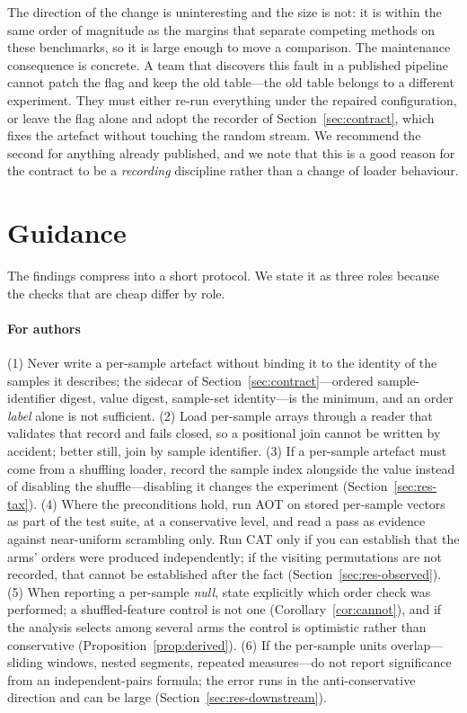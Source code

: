 \documentclass[a4paper,fleqn]{cas-sc}
\begin{document}
The direction of the change is uninteresting and the size is not: it is within
the same order of magnitude as the margins that separate competing methods on
these benchmarks, so it is large enough to move a comparison. The
maintenance consequence is concrete. A team that discovers this fault in a
published pipeline cannot patch the flag and keep the old table---the old table
belongs to a different experiment. They must either re-run everything under the
repaired configuration, or leave the flag alone and adopt the recorder of
Section~\ref{sec:contract}, which fixes the artefact without touching the random
stream. We recommend the second for anything already published, and we note that
this is a good reason for the contract to be a \emph{recording} discipline rather
than a change of loader behaviour.

\section{Guidance}
\label{sec:guidance}

The findings compress into a short protocol. We state it as three roles because
the checks that are cheap differ by role.

\paragraph{For authors}
(1) Never write a per-sample artefact without binding it to the identity of the
samples it describes; the sidecar of Section~\ref{sec:contract}---ordered
sample-identifier digest, value digest, sample-set identity---is the minimum, and
an order \emph{label} alone is not sufficient. (2) Load per-sample arrays
through a reader that validates that record and fails closed, so a positional join
cannot be written by
accident; better still, join by sample identifier. (3) If a per-sample artefact
must come from a shuffling loader, record
the sample index alongside the value instead of disabling the shuffle---disabling
it changes the experiment (Section~\ref{sec:res-tax}). (4) Where the preconditions
hold, run AOT on stored per-sample vectors as part of the test suite, at a
conservative level, and read a pass as evidence against near-uniform scrambling
only. Run CAT only if you can establish that the arms' orders were produced
independently; if the visiting permutations are not recorded, that cannot be
established after the fact (Section~\ref{sec:res-observed}). (5) When reporting a
per-sample \emph{null}, state explicitly
which order check was performed; a shuffled-feature control is not one
(Corollary~\ref{cor:cannot}), and if the analysis selects among several arms the
control is optimistic rather than conservative (Proposition~\ref{prop:derived}).
(6) If the per-sample units overlap---sliding windows, nested segments, repeated
measures---do not report significance from an independent-pairs formula; the error
runs in the anti-conservative direction and can be large
(Section~\ref{sec:res-downstream}).
\end{document}

